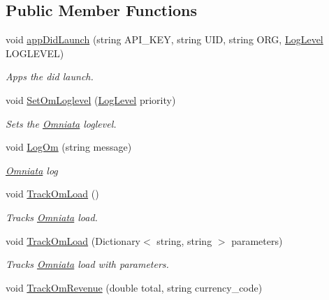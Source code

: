 \subsection*{Public Member Functions}
\begin{DoxyCompactItemize}
\item 
void \hyperlink{class_omniata_s_d_k_1_1_omniata_ab14965769bf1a5b01b5b4c0089dc478f}{app\+Did\+Launch} (string A\+P\+I\+\_\+\+K\+E\+Y, string U\+I\+D, string O\+R\+G, \hyperlink{class_omniata_s_d_k_1_1_omniata_aac4ddf8e7386e787ff7ff8bab48cc6de}{Log\+Level} L\+O\+G\+L\+E\+V\+E\+L)
\begin{DoxyCompactList}\small\item\em Apps the did launch. \end{DoxyCompactList}\item 
void \hyperlink{class_omniata_s_d_k_1_1_omniata_a94fe07ba323ce0fed14b91852c7f7848}{Set\+Om\+Loglevel} (\hyperlink{class_omniata_s_d_k_1_1_omniata_aac4ddf8e7386e787ff7ff8bab48cc6de}{Log\+Level} priority)
\begin{DoxyCompactList}\small\item\em Sets the \hyperlink{class_omniata_s_d_k_1_1_omniata}{Omniata} loglevel. \end{DoxyCompactList}\item 
void \hyperlink{class_omniata_s_d_k_1_1_omniata_ab085c7c3be514851414ebe5c009f59b4}{Log\+Om} (string message)
\begin{DoxyCompactList}\small\item\em \hyperlink{class_omniata_s_d_k_1_1_omniata}{Omniata} log \end{DoxyCompactList}\item 
void \hyperlink{class_omniata_s_d_k_1_1_omniata_afebdbc87ee705a0c1e67d7a742f52f68}{Track\+Om\+Load} ()
\begin{DoxyCompactList}\small\item\em Tracks \hyperlink{class_omniata_s_d_k_1_1_omniata}{Omniata} load. \end{DoxyCompactList}\item 
void \hyperlink{class_omniata_s_d_k_1_1_omniata_a3de8b8c2d2de2000c0df1309eeac912d}{Track\+Om\+Load} (Dictionary$<$ string, string $>$ parameters)
\begin{DoxyCompactList}\small\item\em Tracks \hyperlink{class_omniata_s_d_k_1_1_omniata}{Omniata} load with parameters. \end{DoxyCompactList}\item 
void \hyperlink{class_omniata_s_d_k_1_1_omniata_a7d73aa81f2d5ba389b3af2d3cfbe6bab}{Track\+Om\+Revenue} (double total, string currency\+\_\+code)

\end{DoxyCompactItemize}
